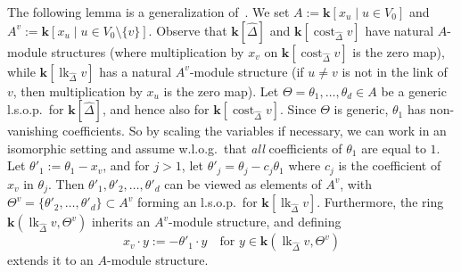 \documentclass[10pt]{amsart}
\theoremstyle{definition}
\DeclareMathOperator\lk{lk}
\DeclareMathOperator\cost{cost}
\newcommand{\complet}[1]{\hat{#1}}
\newcommand{\field}{\mathbf{k}}
\begin{document}
 The following lemma is a generalization of~\cite[Proposition~4.24]{Swartz-09}. We set $A:=\field[x_u \mid u\in V_0]$ and $A^v:=\field[x_u \mid u\in V_0\setminus\{v\}]$.
Observe that $\field[\complet{\Delta}]$ and $\field[\cost_{\complet{\Delta}}v]$ have natural $A$-module structures (where multiplication by $x_v$ on $\field[\cost_{\complet{\Delta}}v]$ is the zero map), while $\field[\lk_{\complet{\Delta}}v]$ has a natural $A^v$-module structure (if $u\neq v$ is not in the link of $v$, then multiplication by $x_u$ is the zero map). Let $\Theta=\theta_1,\ldots,\theta_d\in A$ be a generic l.s.o.p.~for $\field[\complet{\Delta}]$, and hence also for $\field[\cost_{\complet{\Delta}}v]$. Since $\Theta$ is generic, $\theta_1$ has non-vanishing coefficients. So by scaling the variables if necessary, we can work in an isomorphic setting and assume w.l.o.g.~that \emph{all} coefficients of $\theta_1$ are equal to $1$. 
Let $\theta'_1:=\theta_1-x_v$, and for $j>1$, let $\theta'_j=\theta_j-c_j\theta_1$ where $c_j$ is the coefficient of $x_v$ in $\theta_j$. Then $\theta'_1, \theta'_2,\ldots,\theta'_d$ can be viewed as elements of $A^v$, with $\Theta^v=\{\theta'_2,\ldots,\theta'_d\}\subset A^v$ forming an l.s.o.p.~for $\field[\lk_{\complet{\Delta}}v]$. Furthermore, the ring $\field(\lk_{\complet{\Delta}}v, \Theta^v)$ inherits an $A^v$-module structure, and defining
\[
x_v\cdot y:=-\theta'_1\cdot y \quad \mbox{for }y\in \field(\lk_{\complet{\Delta}}v, \Theta^v)
\]
extends it to an $A$-module structure.
\end{document}
